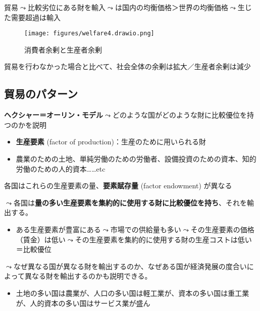 \documentclass[
  xelatex,
  ja=standard]{bxjsarticle}
\providecommand{\tightlist}{%
  \setlength{\itemsep}{0pt}\setlength{\parskip}{0pt}}\usepackage{longtable,booktabs,array}
\begin{document}
貿易\(\leadsto\)比較劣位にある財を輸入\(\leadsto\)は国内の均衡価格＞世界の均衡価格\(\leadsto\)生じた需要超過は輸入

\begin{figure}[htpb]

{\centering \texttt{[image: figures/welfare4.drawio.png]}

}

\caption{消費者余剰と生産者余剰}

\end{figure}

貿易を行わなかった場合と比べて、社会全体の余剰は拡大／生産者余剰は減少

\hypertarget{ux8cbfux6613ux306eux30d1ux30bfux30fcux30f3}{%
\subsection{貿易のパターン}\label{ux8cbfux6613ux306eux30d1ux30bfux30fcux30f3}}

\textbf{ヘクシャー＝オーリン・モデル}\(\leadsto\)どのような国がどのような財に比較優位を持つのかを説明

\begin{itemize}
\tightlist
\item
  \textbf{生産要素} (factor of production)：生産のために用いられる財
\item
  農業のための土地、単純労働のための労働者、設備投資のための資本、知的労働のための人的資本\ldots\ldots etc
\end{itemize}

各国はこれらの生産要素の量、\textbf{要素賦存量} (factor endowment)
が異なる

\(\leadsto\)各国は\textbf{量の多い生産要素を集約的に使用する財に比較優位を持ち}、それを輸出する。

\begin{itemize}
\tightlist
\item
  ある生産要素が豊富にある\(\leadsto\)市場での供給量も多い\(\leadsto\)その生産要素の価格（賃金）は低い\(\leadsto\)その生産要素を集約的に使用する財の生産コストは低い＝比較優位
\end{itemize}

\(\leadsto\)なぜ異なる国が異なる財を輸出するのか、なぜある国が経済発展の度合いによって異なる財を輸出するのかも説明できる。

\begin{itemize}
\tightlist
\item
  土地の多い国は農業が、人口の多い国は軽工業が、資本の多い国は重工業が、人的資本の多い国はサービス業が盛ん
\end{itemize}
\end{document}
